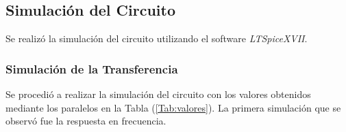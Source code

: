 \subsection{Simulación del Circuito}
\label{sec:simulacion}

Se realizó la simulación del circuito utilizando el software \textit{LTSpiceXVII}.

\subsubsection{Simulación de la Transferencia}

Se procedió a realizar la simulación del circuito con los valores obtenidos mediante los paralelos en la Tabla (\ref{Tab:valores}). La primera simulación que se observó fue la respuesta en frecuencia.

